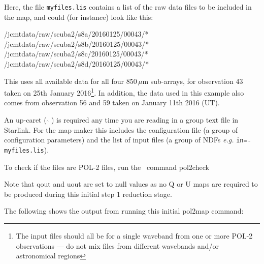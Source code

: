 \begin{terminalv}
\end{terminalv}


Here, the file \texttt{myfiles.lis} contains a list of the raw data
files to be included in the map, and could (for instance) look like this:

\begin{terminalv}
/jcmtdata/raw/scuba2/s8a/20160125/00043/*
/jcmtdata/raw/scuba2/s8b/20160125/00043/*
/jcmtdata/raw/scuba2/s8c/20160125/00043/*
/jcmtdata/raw/scuba2/s8d/20160125/00043/*
\end{terminalv}

This uses all available data for all four 850\,$\mu$m sub-arrays, for
observation 43 taken on 25th January 2016\footnote{The input files should all be
for a single waveband from one or more POL-2 observations --- do not mix files from
different wavebands and/or astronomical regions}. In addition, the data used in this example also
comes from observation 56 and 59 taken on January 11th 2016 (UT).

\begin{tip}

An up-caret ( $ \hat{} $ ) is required any time you are reading in a group
text file in Starlink. For the map-maker this includes the configuration
file (a group of configuration parameters) and the list of input files (a
group of NDFs \emph{e.g.} \texttt{in= $ \hat{} $ myfiles.lis}).

To check if the files are POL-2 files, run the \smurf\ command pol2check
\begin{terminalv}
\end{terminalv}
\end{tip}

Note that qout and uout are set to null values as no Q or U maps are required
to be produced during this initial step 1 reduction stage.

The following shows the output from running this initial pol2map command:

